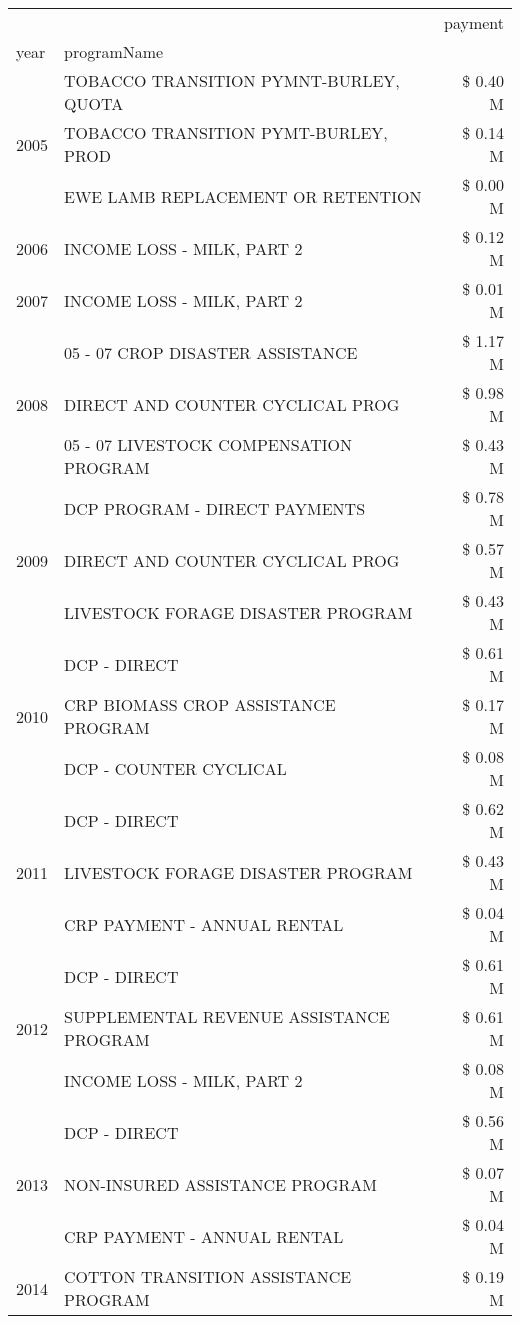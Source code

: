 \begin{tabular}{llr}
\toprule
 &  & payment \\
year & programName &  \\
\midrule
\multirow[t]{3}{*}{2005} & TOBACCO TRANSITION PYMNT-BURLEY, QUOTA & \$ 0.40 M \\
 & TOBACCO TRANSITION PYMT-BURLEY, PROD & \$ 0.14 M \\
 & EWE LAMB REPLACEMENT OR RETENTION & \$ 0.00 M \\
\cline{1-3}
2006 & INCOME LOSS - MILK, PART 2 & \$ 0.12 M \\
\cline{1-3}
2007 & INCOME LOSS - MILK, PART 2 & \$ 0.01 M \\
\cline{1-3}
\multirow[t]{3}{*}{2008} & 05 - 07 CROP DISASTER ASSISTANCE & \$ 1.17 M \\
 & DIRECT AND COUNTER CYCLICAL PROG & \$ 0.98 M \\
 & 05 - 07 LIVESTOCK COMPENSATION PROGRAM & \$ 0.43 M \\
\cline{1-3}
\multirow[t]{3}{*}{2009} & DCP PROGRAM - DIRECT PAYMENTS & \$ 0.78 M \\
 & DIRECT AND COUNTER CYCLICAL PROG & \$ 0.57 M \\
 & LIVESTOCK FORAGE DISASTER  PROGRAM & \$ 0.43 M \\
\cline{1-3}
\multirow[t]{3}{*}{2010} & DCP - DIRECT & \$ 0.61 M \\
 & CRP BIOMASS CROP ASSISTANCE PROGRAM & \$ 0.17 M \\
 & DCP - COUNTER CYCLICAL & \$ 0.08 M \\
\cline{1-3}
\multirow[t]{3}{*}{2011} & DCP - DIRECT & \$ 0.62 M \\
 & LIVESTOCK FORAGE DISASTER PROGRAM & \$ 0.43 M \\
 & CRP PAYMENT - ANNUAL RENTAL & \$ 0.04 M \\
\cline{1-3}
\multirow[t]{3}{*}{2012} & DCP - DIRECT & \$ 0.61 M \\
 & SUPPLEMENTAL REVENUE ASSISTANCE PROGRAM & \$ 0.61 M \\
 & INCOME LOSS - MILK, PART 2 & \$ 0.08 M \\
\cline{1-3}
\multirow[t]{3}{*}{2013} & DCP - DIRECT & \$ 0.56 M \\
 & NON-INSURED ASSISTANCE PROGRAM & \$ 0.07 M \\
 & CRP PAYMENT - ANNUAL RENTAL & \$ 0.04 M \\
\cline{1-3}
\multirow[t]{3}{*}{2014} & COTTON TRANSITION ASSISTANCE PROGRAM & \$ 0.19 M \\

\end{tabular}
